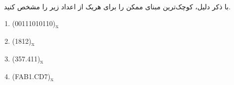  با ذکر دلیل، کوچک‌ترین مبنای ممکن را برای هریک از اعداد زیر را مشخص کنید.

\begin{latin}
	\begin{enumerate}
		\item 
		(00111010110)\textsubscript{x}
		
		\item 
		(1812)\textsubscript{x}
		
		\item 
		(357.411)\textsubscript{x}
		
		\item 
		(FAB1.CD7)\textsubscript{x}
	\end{enumerate}
\end{latin}















%






%
